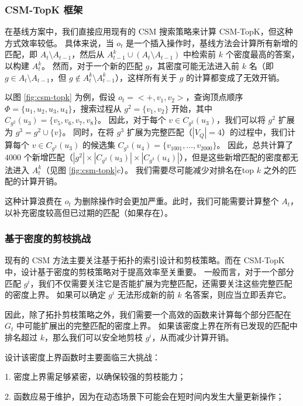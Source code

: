 \subsubsection{CSM-TopK 框架}

在基线方案中，我们直接应用现有的 CSM 搜索策略来计算 CSM-TopK，但这种方式效率较低。
具体来说，当 $o_t$ 是一个插入操作时，基线方法会计算所有新增的匹配，即 $A_{t} \setminus A_{t-1}$，然后从 $A_{t-1}^k \cup (A_{t} \setminus A_{t-1})$ 中检索前 $k$ 个密度最高的答案，以构建 $A_t^k$。
然而，对于一个新的匹配 $g$，其密度可能无法进入前 $k$ 名（即 $g \in A_{t} \setminus A_{t-1}$，但 $g \notin A_{t}^k \setminus A_{t-1}^k$），这样所有关于 $g$ 的计算都变成了无效开销。

以图 \ref{fig:csm-topk} 为例，假设 $o_t = <+, v_1, v_2>$，查询顶点顺序 $\Phi = \{u_1, u_2, u_3, u_4\}$，搜索过程从 $g^2 = \{v_1, v_2\}$ 开始，其中 $C_{g^{2}}(u_{3}) = \{v_5, v_6, v_7, v_8\}$。
因此，对于每个 $v \in C_{g^{2}}(u_{3})$，我们可以将 $g^2$ 扩展为 $g^3 = g^2 \cup \{v\}$。
同时，在将 $g^3$ 扩展为完整匹配（$|V_Q| = 4$）的过程中，我们计算每个 $v \in C_{g^{2}}(u_{3})$ 的候选集 $C_{g^{3}}(u_{4}) = \{v_{1001}, \dots, v_{2000}\}$。
因此，总共计算了 $4000$ 个新增匹配（$|g^2| \times |C_{g^{2}}(u_{3})| \times |C_{g^{3}}(u_{4})|$），但是这些新增匹配的密度都无法进入 $A^k_t$（见图 \ref{fig:csm-topk}c）。
我们需要尽可能减少对排名在top $k$ 之外的匹配的计算开销。

这种计算浪费在 $o_t$ 为删除操作时会更加严重。此时，我们可能需要计算整个 $A_{t}$，以补充密度较高但已过期的匹配（如果存在）。

\subsubsection{基于密度的剪枝挑战}

现有的 CSM 方法主要关注基于拓扑的索引设计和剪枝策略。而在 CSM-TopK 中，设计基于密度的剪枝策略对于提高效率至关重要。
一般而言，对于一个部分匹配 $g^i$，我们不仅需要关注它是否能扩展为完整匹配，还需要关注这些完整匹配的密度上界。
如果可以确定 $g^i$ 无法形成新的前 $k$ 名答案，则应当立即丢弃它。

因此，除了拓扑剪枝策略之外，我们需要一个高效的函数来计算每个部分匹配在 $G_t$ 中可能扩展出的完整匹配的密度上界。
如果该密度上界在所有已发现的匹配中排名超过 $k$，那么我们可以安全地剪枝 $g^i$，从而减少计算开销。

设计该密度上界函数时主要面临三大挑战：

	1.	密度上界需足够紧密，以确保较强的剪枝能力；

	2.	函数应易于维护，因为在动态场景下可能会在短时间内发生大量更新操作；


